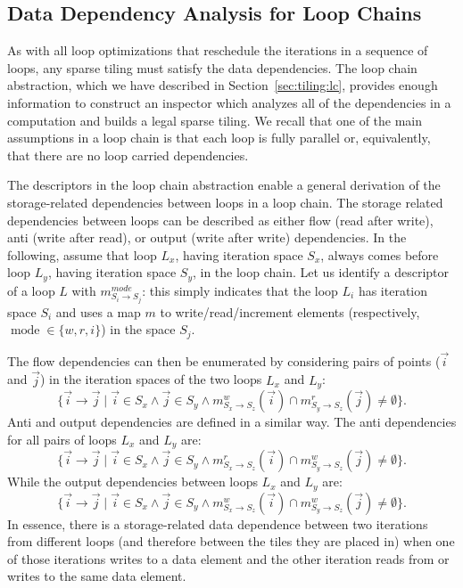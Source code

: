 \subsection{Data Dependency Analysis for Loop Chains}

As with all loop optimizations that reschedule the iterations in a sequence of loops, any sparse tiling must satisfy the data dependencies. The loop chain abstraction, which we have described in Section~\ref{sec:tiling:lc}, provides enough information to construct an inspector which analyzes all of the dependencies in a computation and builds a legal sparse tiling. We recall that one of the main assumptions in a loop chain is that each loop is fully parallel or, equivalently, that there are no loop carried dependencies.

The descriptors in the loop chain abstraction enable a general derivation of the storage-related dependencies between loops in a loop chain. The storage related dependencies between loops can be described as either flow (read after write), anti (write after read), or output (write after write) dependencies. In the following, assume that loop $L_x$, having iteration space $S_x$, always comes before loop $L_y$, having iteration space $S_y$, in the loop chain. Let us identify a descriptor of a loop $L$ with $m_{S_i \rightarrow S_j}^{mode}$: this simply indicates that the loop $L_i$ has iteration space $S_i$ and uses a map $m$ to write/read/increment elements (respectively, $\operatorname{mode} \in \lbrace w, r, i\rbrace$) in the space $S_j$.

The flow dependencies can then be enumerated by considering pairs of points ($\vec{i}$ and $\vec{j}$) in the iteration spaces of the two loops $L_x$ and $L_y$:
\[
	\{ \vec{i} \rightarrow \vec{j} \; | \; \vec{i} \in S_x \wedge \vec{j} \in S_y \wedge 
	m_{S_x\rightarrow S_z}^{w}(\vec{i}) \cap m_{S_y \rightarrow S_z}^{r}(\vec{j}) \ne \emptyset \}.
\]
Anti and output dependencies are defined in a similar way. The anti dependencies for all pairs of loops $L_x$ and $L_y$ are:
\[
	\{ \vec{i} \rightarrow \vec{j} \; | \; \vec{i} \in S_x \wedge \vec{j} \in S_y \wedge 
	m_{S_x\rightarrow S_z}^{r}(\vec{i}) \cap m_{S_y \rightarrow S_z}^{w}(\vec{j}) \ne \emptyset \}.
\]
While the output dependencies between loops $L_x$ and $L_y$ are:
\[
	\{ \vec{i} \rightarrow \vec{j} \; | \; \vec{i} \in S_x \wedge \vec{j} \in S_y \wedge 
	m_{S_x\rightarrow S_z}^{w}(\vec{i}) \cap m_{S_y \rightarrow S_z}^{w}(\vec{j}) \ne \emptyset \}.
\]
In essence, there is a storage-related data dependence between two iterations from different loops (and therefore between the tiles they are placed in) when one of those iterations writes to a data element and the other iteration reads from or writes to the same data element.

